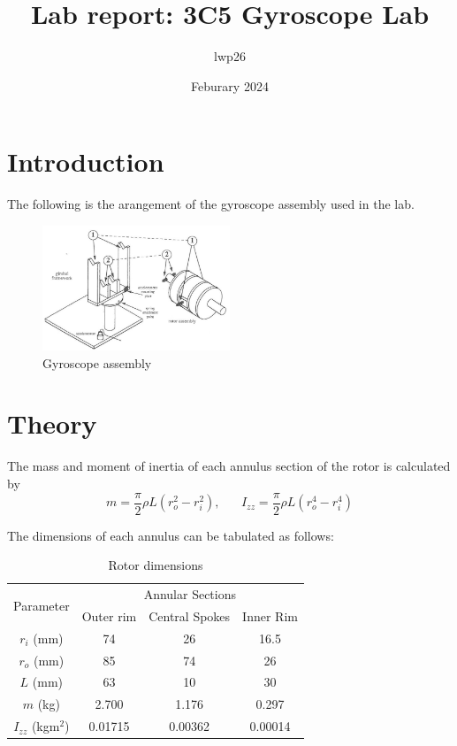 \documentclass[8pt]{article}
\begin{document}

\title{Lab report: 3C5 Gyroscope Lab}
\author{lwp26}
\date{Feburary 2024}
\maketitle

\section{Introduction}

The following is the arangement of the gyroscope assembly used in the lab.

\begin{figure}[H]
    \centering
    \includegraphics[width=0.5\textwidth]{setup.jpg}
    \caption{Gyroscope assembly}
    \label{fig:setup}
\end{figure}

\section{Theory}

The mass and moment of inertia of each annulus section of the rotor is calculated by
\begin{equation}
    m = \frac{\pi}{2} \rho L(r_o^2 - r_i^2), \;\;\;\;\;\; I_{zz} = \frac{\pi}{2} \rho L(r_o^4 - r_i^4)
\end{equation}

The dimensions of each annulus can be tabulated as follows:

\begin{table}[H]
    \centering
    \begin{tabular}{|c|c|c|c|}
        \hline
        \multirow{ 2}{*}{Parameter} & \multicolumn{3}{|c|}{Annular Sections} \\
        \cline{2-4}
        & Outer rim & Central Spokes & Inner Rim \\
        \hline
        $r_i$ (mm) & 74 & 26 & 16.5 \\
        $r_o$ (mm) & 85 & 74 & 26 \\
        $L$ (mm) & 63 & 10 & 30 \\
        \hline
        $m$ (kg) & 2.700 & 1.176 & 0.297 \\
        \hline
        $I_{zz}$ (kgm$^2$) & 0.01715	& 0.00362 & 0.00014 \\
        \hline

    \end{tabular}
    \caption{Rotor dimensions}
\end{table}
\end{document}
